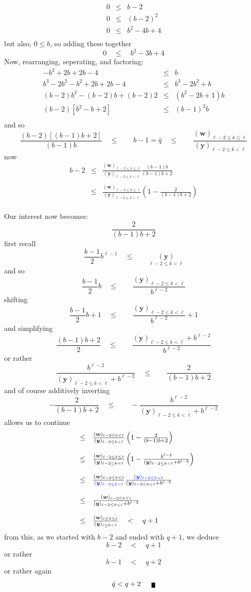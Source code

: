 \documentclass[twoside]{article}
\renewcommand{\leq}{\ensuremath{\quad\le\qquad}}
\newcommand{\bradix}[2][u]{\ensuremath{\underset{#2}{(\bm{#1})}}}
\newcommand{\numer}[3][w]{\ensuremath{(\bm{#1})_{#2\le k\le #3}}}
\newcommand{\denom}[3][y]{\ensuremath{(\bm{#1})_{#2\le k <  #3}}}
\newcommand{\qed}{\nobreak \ifvmode \relax \else
      \ifdim\lastskip<1.5em \hskip-\lastskip
      \hskip1.5em plus0em minus0.5em \fi \nobreak
      \vrule height0.5em width0.5em depth0.25em\fi}
\begin{document}
$$ \begin{array}{rcl}
0 & \le & b-2 \\
0 & \le & (b-2)^2 \\
0 & \le & b^2-4b+4 \\
\end{array} $$
but also, $ 0\le b $, so adding these together
$$ 0\quad\le\quad b^2-3b+4 $$
Now, rearranging, seperating, and factoring:
$$ \begin{array}{rcl}
-b^2+2b+2b-4 & \le & b \\
b^3-2b^2-b^2+2b+2b-4 & \le & b^3-2b^2+b \\
(b-2)b^2-(b-2)b+(b-2)2 & \le & (b^2-2b+1)b \\
(b-2)[b^2-b+2] & \le & (b-1)^2b \\
\end{array} $$
and so
$$ \frac{(b-2)[(b-1)b+2]}{(b-1)b}\leq b-1=\bar{q}\leq\frac{\numer{\ell-2}{\ell}}{\denom{\ell-2}{\ell}} $$
now
$$ \begin{array}{rcl}
b-2 & \le & \frac{\numer{\ell-2}{\ell}}{\denom{\ell-2}{\ell}}\frac{(b-1)b}{(b-1)b+2} \\
\\
	& \le & \frac{\numer{\ell-2}{\ell}}{\denom{\ell-2}{\ell}}\left(1-\frac{2}{(b-1)b+2}\right) \\
\end{array} $$

Our interest now becomes:
$$ \frac{2}{(b-1)b+2} $$
first recall
$$ \frac{b-1}{2}b^{\ell-1}\leq\bradix[y]{\ell-2\le k < \ell} $$
and so
$$ \frac{b-1}{2}b\leq\frac{\denom{\ell-2}{\ell}}{b^{\ell-2}} $$
shifting
$$ \frac{b-1}{2}b+1\leq\frac{\denom{\ell-2}{\ell}}{b^{\ell-2}}+1 $$
and simplifying
$$ \frac{(b-1)b+2}{2}\leq\frac{\denom{\ell-2}{\ell}+b^{\ell-2}}{b^{\ell-2}} $$
or rather
$$ \frac{b^{\ell-2}}{\denom{\ell-2}{\ell}+b^{\ell-2}}\leq\frac{2}{(b-1)b+2} $$
and of course additively inverting
$$ -\frac{2}{(b-1)b+2}\leq-\frac{b^{\ell-2}}{\denom{\ell-2}{\ell}+b^{\ell-2}} $$
allows us to continue
$$ \begin{array}{rcl}
	& \le & \frac{\numer{\ell-2}{\ell}}{\denom{\ell-2}{\ell}}\left(1-\frac{2}{(b-1)b+2}\right) \\
\\
	& \le & \frac{\numer{\ell-2}{\ell}}{\denom{\ell-2}{\ell}}\left(1-\frac{b^{\ell-2}}{\denom{\ell-2}{\ell}+b^{\ell-2}}\right) \\
\\
	& \le & \frac{\numer{\ell-2}{\ell}}{\textcolor{blue}{\denom{\ell-2}{\ell}}}
		\frac{\textcolor{blue}{\denom{\ell-2}{\ell}}}{\denom{\ell-2}{\ell}+b^{\ell-2}} \\
\\
	& \le & \frac{\numer{\ell-2}{\ell}}{\denom{\ell-2}{\ell}+b^{\ell-2}} \\
\\
	& \le & \frac{\numer{i}{\ell}}{\denom{i}{\ell}}\quad <\quad q+1 \\
\end{array} $$
from this, as we started with $ b-2 $ and ended with $ q+1 $, we deduce
$$ b-2\quad < \quad q+1 $$
or rather
$$ b-1\quad < \quad q+2 $$
or rather again
$$ \bar{q} < q+2\qed $$
\end{document}
